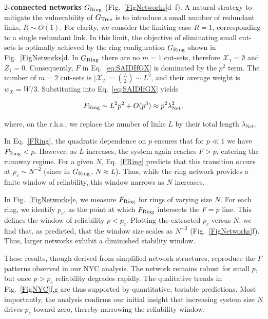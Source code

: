 \documentclass[oneside, a4paper, onecolumn, 11pt]{article}
\newcommand{\X}{\mathcal X}
\begin{document}
\begin{refsection}
\vspace{3mm}
\textbf{\color{blue} $2$-connected networks $G_{\rm Ring}$} (Fig.\ \ref{FigNetworks}d–f).
A natural strategy to mitigate the vulnerability of $G_{\rm Tree}$ is to introduce a small number of redundant links, $R \sim O(1)$. For clarity, we consider the limiting case $R = 1$, corresponding to a single redundant link. In this limit, the objective of eliminating small cut-sets is optimally achieved by the ring configuration $G_{\rm Ring}$ shown in Fig.\ \ref{FigNetworks}d. In $G_{\rm Ring}$ there are no $m = 1$ cut-sets, therefore $\X_1 = \emptyset$ and $Z_1 = 0$. Consequently, $F$ in Eq.\ \eqref{eq:SAIDIfGX} is dominated by the $p^2$ term. The number of $m = 2$ cut-sets is $|\X_2| = \binom{L}{2} \sim L^2$, and their average weight is $w_X = W/3$. Substituting into Eq.\ \eqref{eq:SAIDIfGX} yields

\begin{equation}
\label{FRing}
F_{\rm Ring} \sim L^2 p^2 + O(p^3) \approx p^2 \lambda_{\text{Net}}^2,
\end{equation}

where, on the r.h.s., we replace the number of links $L$ by their total length $\lambda_{\text{Net}}$.

In Eq.\ \eqref{FRing}, the quadratic dependence on $p$ ensures that for $p \ll 1$ we have $F_{\rm Ring} < p$. However, as $L$ increases, the system again reaches $F > p$, entering the runaway regime. For a given $N$, Eq.\ \eqref{FRing} predicts that this transition occurs at $p_c \sim N^{-2}$ (since in $G_{\rm Ring}$, $N \approx L$). Thus, while the ring network provides a finite window of reliability, this window narrows as $N$ increases.

In Fig.\ \ref{FigNetworks}e, we measure $F_{\rm Ring}$ for rings of varying size $N$. For each ring, we identify $p_c$, as the point at which $F_{\rm Ring}$ intersects the $F = p$ line. This defines the window of reliability $p < p_c$. Plotting the extracted $p_c$ versus $N$, we find that, as predicted, that the window size scales as $N^{-2}$ (Fig.\ \ref{FigNetworks}f). Thus, larger networks exhibit a diminished stability window. 

These results, though derived from simplified network structures, reproduce the $F$ patterns observed in our NYC analysis. The network remains robust for small $p$, but once $p > p_c$ reliability degrades rapidly. The qualitative trends in Fig.\ \ref{FigNYC}f,g are thus supported by quantitative, testable predictions. Most importantly, the analysis confirms our initial insight that increasing system size $N$ drives $p_c$ toward zero, thereby narrowing the reliability window.


\end{refsection}
\end{document}
